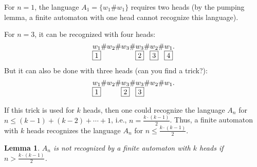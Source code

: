 \documentclass[12pt,sans]{article}
\theoremstyle{definition}
\theoremstyle{plain}
\newtheorem{lemma}{Lemma}[section]
\theoremstyle{remark}
\begin{document}
For $n = 1$, the language $A_1 = \{w_1\#w_1\}$ requires two heads (by the pumping lemma, a finite automaton with one head cannot recognize this language).

For $n = 3$, it can be recognized with four heads:
\[
\underset{\fbox{1}}{w_1}\#w_2\#w_3\#\underset{\fbox{2}}{w_3}\#\underset{\fbox{3}}{w_2}\#\underset{\fbox{4}}{w_1}.
\]
But it can also be done with three heads (can you find a trick?):
\[
\underset{\fbox{1}}{w_1}\#w_2\#\underset{\fbox{2}}{w_3}\#\underset{\fbox{3}}{w_3}\#w_2\#w_1.
\]

If this trick is used for $k$ heads, then one could recognize the language $A_n$ for $n \le (k-1) + (k-2) + \dotsb + 1$, i.e., $n = \frac{k \cdot (k-1)}{2}$. Thus, a finite automaton with $k$ heads recognizes the language $A_n$ for $n \le \frac{k \cdot (k-1)}{2}$.

\begin{lemma}
    $A_n$ is not recognized by a finite automaton with $k$ heads if $n > \frac{k \cdot (k-1)}{2}$.
\end{lemma}
\end{document}
